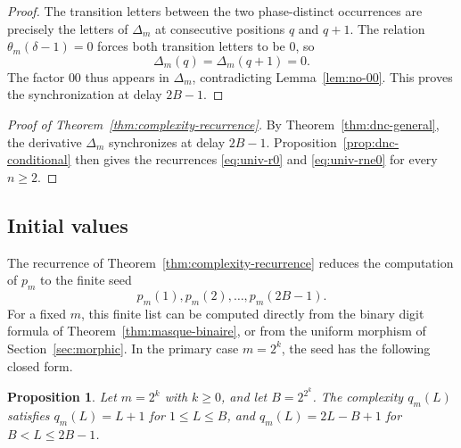\documentclass[12pt,reqno]{article}
\theoremstyle{plain}
\newtheorem{proposition}[theorem]{Proposition}
\theoremstyle{definition}
\begin{document}
\begin{proof}
The transition letters between the two phase-distinct occurrences are precisely the letters of $\Delta_m$ at consecutive positions $q$ and $q+1$. The relation $\theta_m(\delta - 1) = 0$ forces both transition letters to be $0$, so
\[
  \Delta_m(q) = \Delta_m(q + 1) = 0.
\]
The factor $00$ thus appears in $\Delta_m$, contradicting Lemma~\ref{lem:no-00}. This proves the synchronization at delay $2B-1$.
\end{proof}

\begin{proof}[Proof of Theorem~\ref{thm:complexity-recurrence}]
By Theorem~\ref{thm:dnc-general}, the derivative $\Delta_m$ synchronizes
at delay $2B-1$. Proposition~\ref{prop:dnc-conditional} then gives the
recurrences \eqref{eq:univ-r0} and \eqref{eq:univ-rne0} for every
$n\ge2$.
\end{proof}

\subsection{Initial values}
\label{subsec:initial-values}

The recurrence of Theorem~\ref{thm:complexity-recurrence} reduces the
computation of \(p_m\) to the finite seed
\[
  p_m(1),p_m(2),\ldots,p_m(2B-1).
\]
For a fixed \(m\), this finite list can be computed directly from the
binary digit formula of Theorem~\ref{thm:masque-binaire}, or from the
uniform morphism of Section~\ref{sec:morphic}. In the primary case
\(m=2^k\), the seed has the following closed form.

\begin{proposition}
\label{prop:delta-initial-complexity}
Let $m = 2^k$ with $k \ge 0$, and let $B = 2^{2^k}$. The complexity $q_m(L)$ satisfies $q_m(L) = L + 1$ for $1 \le L \le B$, and $q_m(L) = 2L - B + 1$ for $B < L \le 2B - 1$.
\end{proposition}
\end{document}
